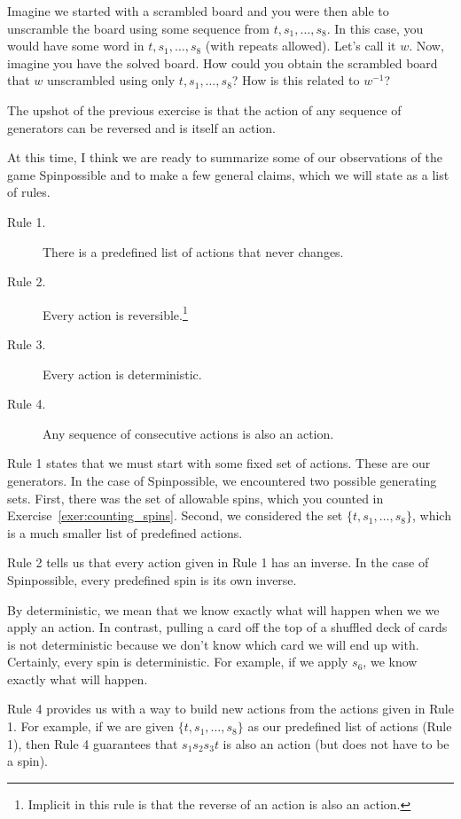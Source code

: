 \begin{exercise}
Imagine we started with a scrambled board and you were then able to unscramble the board using some sequence from $t, s_1, \ldots, s_8$.  In this case, you would have some word in $t, s_1, \ldots, s_8$ (with repeats allowed). Let's call it $w$.  Now, imagine you have the solved board.  How could you obtain the scrambled board that $w$ unscrambled using only $t, s_1,\ldots, s_8$? How is this related to $w^{-1}$?
\end{exercise}

The upshot of the previous exercise is that the action of any sequence of generators can be reversed and is itself an action.

At this time, I think we are ready to summarize some of our observations of the game Spinpossible and to make a few general claims, which we will state as a list of rules.

\begin{description}
\item[Rule 1.] There is a predefined list of actions that never changes.
\item[Rule 2.] Every action is reversible.\footnote{Implicit in this rule is that the reverse of an action is also an action.}
\item[Rule 3.] Every action is deterministic.
\item[Rule 4.] Any sequence of consecutive actions is also an action.
\end{description}

Rule 1 states that we must start with some fixed set of actions. These are our generators.  In the case of Spinpossible, we encountered two possible generating sets.  First, there was the set of allowable spins, which you counted in Exercise~\ref{exer:counting_spins}.  Second, we considered the set $\{t,s_1,\ldots, s_8\}$, which is a much smaller list of predefined actions.

Rule 2 tells us that every action given in Rule 1 has an inverse. In the case of Spinpossible, every predefined spin is its own inverse.

By deterministic, we mean that we know exactly what will happen when we we apply an action.  In contrast, pulling a card off the top of a shuffled deck of cards is not deterministic because we don't know which card we will end up with. Certainly, every spin is deterministic. For example, if we apply $s_6$, we know exactly what will happen.

Rule 4 provides us with a way to build new actions from the actions given in Rule 1.  For example, if we are given $\{t,s_1,\ldots, s_8\}$ as our predefined list of actions (Rule 1), then Rule 4 guarantees that $s_1 s_2 s_3 t$ is also an action (but does not have to be a spin).

